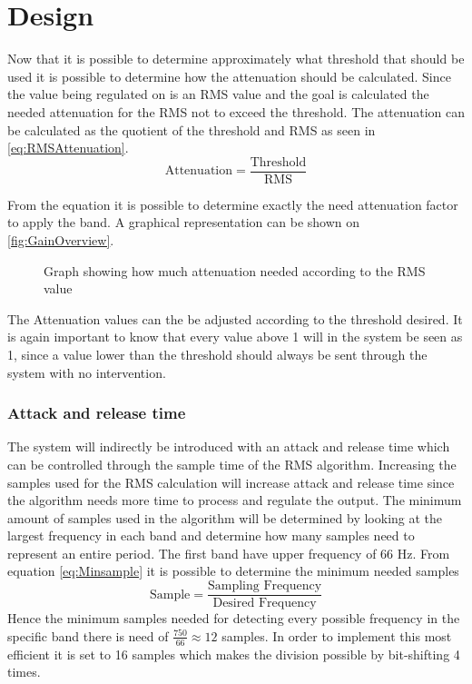 \section{Design}
Now that it is possible to determine approximately what threshold that should be used it is possible to determine how the attenuation should be calculated. Since the value being regulated on is an RMS value and the goal is calculated the needed attenuation for the RMS not to exceed the threshold. The attenuation can be calculated as the quotient of the threshold and RMS as seen in \autoref{eq:RMSAttenuation}.
\begin{equation}\label{eq:RMSAttenuation}
\text{Attenuation} = \frac{\text{Threshold}}{\text{RMS}}
\end{equation}

From the equation it is possible to determine exactly the need attenuation factor to apply the band. A graphical representation can be shown on \autoref{fig:GainOverview}.

\begin{figure}[H]
\centering
{}

\caption{Graph showing how much attenuation needed according to the RMS value}
\label{fig:GainOverview}
\end{figure}

The Attenuation values can the be adjusted according to the threshold desired. It is again important to know that every value above 1 will in the system be seen as 1, since a value lower than the threshold should always be sent through the system with no intervention.  


\subsubsection{Attack and release time}
The system will indirectly be introduced with an attack and release time which can be controlled through the sample time of the RMS algorithm. Increasing the samples used for the RMS calculation will increase attack and release time since the algorithm needs more time to process and regulate the output. The minimum amount of samples used in the algorithm will be determined by looking at the largest frequency in each band and determine how many samples need to represent an entire period. The first band have upper frequency of 66 Hz. From equation \ref{eq:Minsample} it is possible to determine the minimum needed samples
\vspace{-3mm}
\begin{equation}\label{eq:Minsample}
\text{Sample}= \frac{\text{Sampling Frequency}}{\text{Desired Frequency}}
\end{equation} 
Hence the minimum samples needed for detecting every possible frequency in the specific band there is need of $\frac{750}{66} \approx 12$ samples. In order to implement this most efficient it is set to 16 samples which makes the division possible by bit-shifting 4 times.

